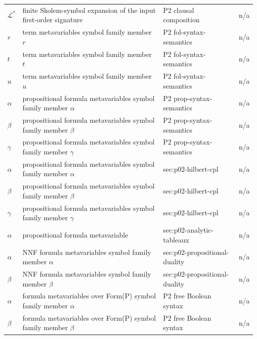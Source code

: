 \begin{longtable}{@{}p{}p{}p{}p{}@{}}
\ensuremath{\mathcal L^*} & finite Skolem-symbol expansion of the input first-order signature & P2 clausal composition & n/a \\
\(r\) & term metavariables symbol family member \(r\) & P2 fol-\allowbreak{}syntax-\allowbreak{}semantics & n/a \\
\(t\) & term metavariables symbol family member \(t\) & P2 fol-\allowbreak{}syntax-\allowbreak{}semantics & n/a \\
\(u\) & term metavariables symbol family member \(u\) & P2 fol-\allowbreak{}syntax-\allowbreak{}semantics & n/a \\
\(\alpha\) & propositional formula metavariables symbol family member \(\alpha\) & P2 prop-\allowbreak{}syntax-\allowbreak{}semantics & n/a \\
\(\beta\) & propositional formula metavariables symbol family member \(\beta\) & P2 prop-\allowbreak{}syntax-\allowbreak{}semantics & n/a \\
\(\gamma\) & propositional formula metavariables symbol family member \(\gamma\) & P2 prop-\allowbreak{}syntax-\allowbreak{}semantics & n/a \\
\(\alpha\) & propositional formula metavariables symbol family member \(\alpha\) & sec:\allowbreak{}p02-\allowbreak{}hilbert-\allowbreak{}cpl & n/a \\
\(\beta\) & propositional formula metavariables symbol family member \(\beta\) & sec:\allowbreak{}p02-\allowbreak{}hilbert-\allowbreak{}cpl & n/a \\
\(\gamma\) & propositional formula metavariables symbol family member \(\gamma\) & sec:\allowbreak{}p02-\allowbreak{}hilbert-\allowbreak{}cpl & n/a \\
\(\alpha\) & propositional formula metavariable & sec:\allowbreak{}p02-\allowbreak{}analytic-\allowbreak{}tableaux & n/a \\
\(\alpha\) & NNF formula metavariables symbol family member \(\alpha\) & sec:\allowbreak{}p02-\allowbreak{}propositional-\allowbreak{}duality & n/a \\
\(\beta\) & NNF formula metavariables symbol family member \(\beta\) & sec:\allowbreak{}p02-\allowbreak{}propositional-\allowbreak{}duality & n/a \\
\(\alpha\) & formula metavariables over Form(P) symbol family member \(\alpha\) & P2 free Boolean syntax & n/a \\
\(\beta\) & formula metavariables over Form(P) symbol family member \(\beta\) & P2 free Boolean syntax & n/a \\

\end{longtable}
